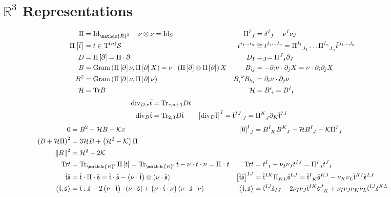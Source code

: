 \documentclass[a4paper,7pt]{scrartcl}
\newcommand{\surf}{\mathcal{S}}
\newcommand{\T}{\mathrm{T}}
\newcommand{\R}{\mathds{R}}
\newcommand{\tps}[1]{\T^{(#1)}\surf}
\newcommand{\tns}{\tps{n}}
\newcommand{\gauss}{\mathcal{K}}
\newcommand{\mean}{\mathcal{H}}
\newcommand{\Tr}{\mathrm{Tr}}
\renewcommand{\div}{\mathrm{div}}
\newcommand{\pism}{\Pi}
\newcommand{\pis}[1]{\pism\left[ #1 \right]}
\newcommand{\pissf}[2]{\tensor{\pism}{^{#1}_{#2}}}
\newcommand{\bsf}[2]{\tensor{B}{^{#1}_{#2}}}
\newcommand{\tsym}{\mathfrak{t}}
\newcommand{\ssym}{\mathfrak{s}}
\newcommand{\ttsym}{\tilde{\tsym}}
\newcommand{\tssym}{\tilde{\ssym}}
\begin{document}
\section{\( \R^{3} \) Representations}

\begin{align*}
  \pism &= \textup{Id}_{\R^{3}} - \nu\otimes\nu = \textup{Id}_{\surf}
        &\pissf{I}{J} &= \tensor{\delta}{^{I}_{J}} - \nu^{I}\nu_{J} \\
  \pis{\tilde{t}} &= t \in\tns
        & t^{i_{1}\ldots i_{n}} &\cong t^{I_{1}\ldots I_{n}} = \pissf{I_{1}}{J_{1}}\ldots\pissf{I_{n}}{J_{n}}\tilde{t}^{J_{1}\ldots J_{n}} \\
  D &= \pis{\partial} = \pism\cdot\partial
        &D_{I} &= _{:I} = \pissf{J}{I}\partial_{J}\\
  B &= \textup{Gram}\left( \pis{\partial}\nu , \pis{\partial}X \right) = \nu \cdot \left(\pis{\partial} \otimes \pis{\partial}\right) X
        &B_{ij} &= -\partial_{i}\nu \cdot \partial_{j}X = \nu \cdot \partial_{i}\partial_{j}X\\
  B^{2} &= \textup{Gram}\left( \pis{\partial}\nu , \pis{\partial}\nu \right)
        &\tensor{B}{_{i}^{k}}B_{kj} &= \partial_{i}\nu \cdot \partial_{j}\nu\\
  \mean &= \Tr B
        &\mean &= \bsf{i}{i} = \bsf{I}{I}
\end{align*}
\begin{align*}
  \div_{D,r}\tilde{t} &= \Tr_{r,n+1}Dt\\
  \div_{D}\ttsym &= \Tr_{2,3}D\ttsym
      & \left[ \div_{D}\ttsym \right]^{I} &= \tensor{\ttsym}{^{IJ}_{:J}} =  \pissf{K}{J}\partial_{K}\ttsym^{IJ}
\end{align*}
\begin{align*}
  0 &= B^{2} - \mean B + \gauss\pi
        &\tensor{\left[ 0 \right]}{^{I}_{J}} &= \bsf{I}{K}\bsf{K}{J} - \mean\bsf{I}{J} + \gauss\pissf{I}{J}\\
  \left( B+\mean\pism \right)^{2} &= 3\mean B + \left( \mean^{2} - \gauss \right)\pism\\
  \left\| B \right\|^{2} &= \mean^{2} - 2\gauss\\
  \Tr t &= \Tr_{\R^{3}}\pis{t} = \Tr_{\R^{3}}t - \nu\cdot t \cdot \nu = \pism : t
            & \Tr t &= \tensor{t}{^{I}_{I}} - \nu_{I}\nu_{J}t^{IJ} = \pissf{I}{J} \tensor{t}{^{J}_{I}}\\
  \ttsym\tssym &= \ttsym\cdot\pism\cdot\tssym = \ttsym\cdot\tssym - \left( \nu\cdot\ttsym \right) \otimes \left( \nu\cdot\tssym \right)
            & \left[ \ttsym\tssym \right]^{IJ} &= \ttsym^{IK}\pism_{KL}\tssym^{LJ} 
                = \tensor{\ttsym}{^{I}_{K}}\tssym^{KJ} - \nu_{K}\nu_{L}\ttsym^{KI}\tssym^{LJ}\\
  \left\langle \ttsym , \tssym \right\rangle &= \ttsym:\tssym 
                                                - 2\left( \nu\cdot\ttsym \right) \cdot \left( \nu\cdot\tssym \right) 
                                                + \left( \nu\cdot\ttsym\cdot\nu \right) \left( \nu\cdot\tssym \cdot\nu \right)
            & \left\langle \ttsym , \tssym \right\rangle
                &= \ttsym^{IJ}\tssym_{IJ} - 2 \nu_{I}\nu_{J}\ttsym^{IK}\tensor{\tssym}{^{J}_{K}} + \nu_{I}\nu_{J}\nu_{K}\nu_{L}\ttsym^{IJ}\tssym^{KL}
\end{align*}
\end{document}
